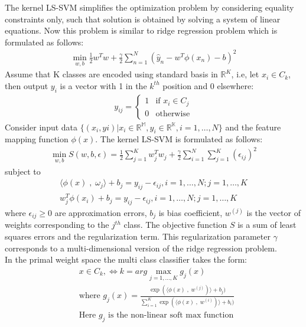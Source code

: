 \documentclass[conference]{IEEEtran}
\begin{document}
    The kernel LS-SVM simplifies the optimization problem by
    considering equality constraints only, such that solution is obtained by solving a system of linear equations.
    Now this problem is similar to ridge regression problem which is formulated as follows:
    \begin{align}
        \min_{w,b} \frac{1}{2}w^{T}w + \frac{\gamma}{2}\sum_{n=1}^{N}(\hat{y}_{n} - w^{T}\phi(x_{n}) - b)^{2}
    \end{align}
    Assume that K classes are encoded using standard basis in $\mathbb{R}^{K}$, i.e, let $x_{i} \in C_{k}$, then output
    $ y_{i}$ is a vector with 1 in the $k^{th}$ position and 0 elsewhere:
    \begin{align}
        y_{ij} = \begin{cases}
                     1 & \text{if } x_{i} \in C_{j} \\
                     0 & \text{otherwise}
        \end{cases}
    \end{align}
    Consider input data $\{(x_{i},y{i}) | x_{i}\in\mathbb{R^{M}},y_{i}\in\mathbb{R^{K}}, i = 1,\ldots,N\}$ and the
    feature mapping function $\phi(x)$.
    The kernel LS-SVM is formulated as follows:
    \begin{align}
        \min_{w,b} S(w,b,\epsilon) = \frac{1}{2}\sum_{j=1}^{K}w_{j}^{T}w_{j} + \frac{\gamma}{2}\sum_{i=1}^{N}\sum_{j=1}^{K}(\epsilon_{ij})^{2}
    \end{align}
    subject to
    \begin{align}
        \langle \phi(x) \;,\; \omega_{j}  \rangle + b_{j} = y_{ij} - \epsilon_{ij}, i = 1,\ldots,N; j = 1,\ldots,K \\
        w_{j}^{T}\phi(x_{i}) + b_{j} = y_{ij} - \epsilon_{ij} , i = 1,\ldots,N; j = 1,\ldots,K
    \end{align}
    where $\epsilon_{ij} \geq 0$ are approximation errors, $b_{j}$ is bias coefficient, $w^{(j)}$ is the vector of
    weights corresponding to the $j^{th}$ class.
    The objective function $S$ is a sum of least squares errors and the
    regularization term.
    This regularization parameter $\gamma$ corresponds to a multi-dimensional version of the ridge
    regression problem.\\
    In the primal weight space the multi class classifier takes the form:
    \begin{align*}
        & x \in C_{k}, \Leftrightarrow k= arg \max_{j=1,\ldots,K} g_{j}(x) \\
        & \text{where } g_{j}(x) = \frac{\exp(\langle \phi(x)\;,\; w^{(j)})\rangle + b_{j})}{\sum_{i=1}^{K} \exp(\langle \phi(x)\;,\; w^{(i)})\rangle + b_{i})} \\
        & \text{Here $g_{j}$ is the non-linear soft max function}
    \end{align*}
\end{document}
